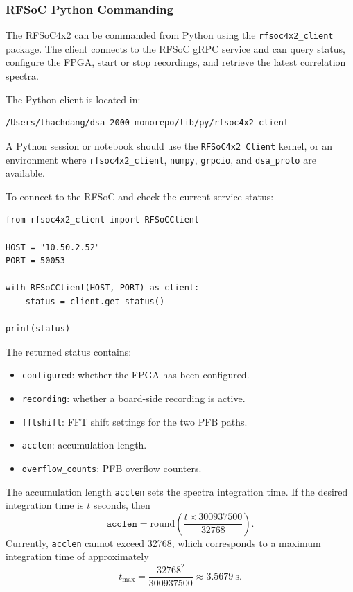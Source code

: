 \documentclass[12pt]{extarticle}
\begin{document}
\subsubsection{RFSoC Python Commanding}

The RFSoC4x2 can be commanded from Python using the \texttt{rfsoc4x2\_client} package. The client connects to the RFSoC gRPC service and can query status, configure the FPGA, start or stop recordings, and retrieve the latest correlation spectra.

The Python client is located in:
\begin{lstlisting}
/Users/thachdang/dsa-2000-monorepo/lib/py/rfsoc4x2-client
\end{lstlisting}

A Python session or notebook should use the \texttt{RFSoC4x2 Client} kernel, or an environment where \texttt{rfsoc4x2\_client}, \texttt{numpy}, \texttt{grpcio}, and \texttt{dsa\_proto} are available.

To connect to the RFSoC and check the current service status:
\begin{lstlisting}
from rfsoc4x2_client import RFSoCClient

HOST = "10.50.2.52"
PORT = 50053

with RFSoCClient(HOST, PORT) as client:
    status = client.get_status()

print(status)
\end{lstlisting}

The returned status contains:
\begin{itemize}
    \item \texttt{configured}: whether the FPGA has been configured.
    \item \texttt{recording}: whether a board-side recording is active.
    \item \texttt{fftshift}: FFT shift settings for the two PFB paths.
    \item \texttt{acclen}: accumulation length.
    \item \texttt{overflow\_counts}: PFB overflow counters.
\end{itemize}

The accumulation length \texttt{acclen} sets the spectra integration time. If the desired integration time is $t$ seconds, then
\begin{equation}
\texttt{acclen}
=
\mathrm{round}
\left(
\frac{t \times 300937500}{32768}
\right).
\end{equation}
Currently, \texttt{acclen} cannot exceed 32768, which corresponds to a maximum integration time of approximately
\[
t_{\max}
=
\frac{32768^2}{300937500}
\approx 3.5679~\mathrm{s}.
\]
\end{document}
